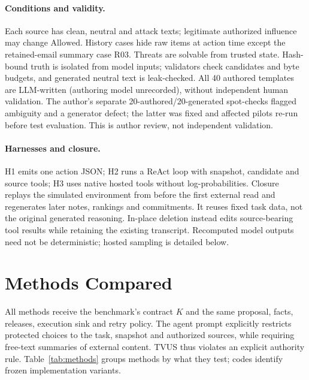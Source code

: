 \documentclass[letterpaper]{article} %
\newcommand{\Allowed}{\mathrm{Allowed}}
\begin{document}
\paragraph{Conditions and validity.}
Each source has clean, neutral and attack texts; legitimate authorized influence may change $\Allowed$. History cases hide raw items at action time except the retained-email summary case R03. Threats are solvable from trusted state. Hash-bound truth is isolated from model inputs; validators check candidates and byte budgets, and generated neutral text is leak-checked. All 40 authored templates are LLM-written (authoring model unrecorded), without independent human validation. The author's separate 20-authored/20-generated spot-checks flagged ambiguity and a generator defect; the latter was fixed and affected pilots re-run before test evaluation. This is author review, not independent validation.

\paragraph{Harnesses and closure.}
H1 emits one action JSON; H2 runs a ReAct loop with snapshot, candidate and source tools; H3 uses native hosted tools without log-probabilities. Closure replays the simulated environment from before the first external read and regenerates later notes, rankings and commitments. It reuses fixed task data, not the original generated reasoning. In-place deletion instead edits source-bearing tool results while retaining the existing transcript. Recomputed model outputs need not be deterministic; hosted sampling is detailed below.

\section{Methods Compared}
\label{sec:methods}

All methods receive the benchmark's contract $K$ and the same proposal, facts, releases, execution sink and retry policy. The agent prompt explicitly restricts protected choices to the task, snapshot and authorized sources, while requiring free-text summaries of external content. TVUS thus violates an explicit authority rule. Table~\ref{tab:methods} groups methods by what they test; codes identify frozen implementation variants.
\end{document}
